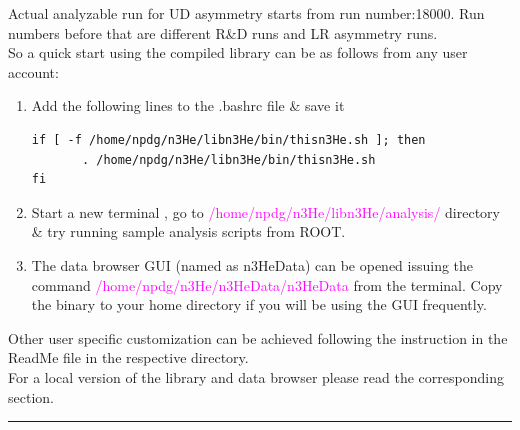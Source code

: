 \documentclass[12pt]{article}
\begin{document}
Actual analyzable run for UD asymmetry starts from run  number:18000. Run numbers before that are different R\&D runs and LR asymmetry runs. \\

So a quick start using the compiled library can be as follows from any user account:

\begin{enumerate}
  \item Add the following lines to the .bashrc file \& save it
 
\begin{lstlisting}
if [ -f /home/npdg/n3He/libn3He/bin/thisn3He.sh ]; then
       . /home/npdg/n3He/libn3He/bin/thisn3He.sh
fi
\end{lstlisting}

 \item Start a new terminal , go to  \textcolor{magenta} { /home/npdg/n3He/libn3He/analysis/ }directory \& try running sample analysis scripts from ROOT.
 \item The data browser GUI (named as n3HeData) can be opened issuing the command\textcolor{magenta}{ /home/npdg/n3He/n3HeData/n3HeData } from the terminal. Copy the binary to your home directory if you will be using the GUI frequently.
\end{enumerate}

Other user specific customization can be achieved following the instruction in the ReadMe file in the respective directory.\\
For a local version of the library and data browser please read the corresponding section.

\noindent
{\color{red} \rule{\linewidth}{1mm} }
 
\newpage
\end{document}
